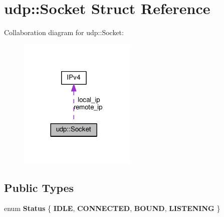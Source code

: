 \hypertarget{structudp_1_1Socket}{}\section{udp\+:\+:Socket Struct Reference}
\label{structudp_1_1Socket}


Collaboration diagram for udp\+:\+:Socket\+:\nopagebreak
\begin{figure}[H]
\begin{center}
\leavevmode
\includegraphics[width=158pt]{structudp_1_1Socket__coll__graph}
\end{center}
\end{figure}
\subsection*{Public Types}
\begin{DoxyCompactItemize}
\item 
enum {\bfseries Status} \{ {\bfseries I\+D\+LE}, 
{\bfseries C\+O\+N\+N\+E\+C\+T\+ED}, 
{\bfseries B\+O\+U\+ND}, 
{\bfseries L\+I\+S\+T\+E\+N\+I\+NG}
 \}\hypertarget{structudp_1_1Socket_a210a8bbcc2ed79b2afdb2c36604bf6fc}{}\label{structudp_1_1Socket_a210a8bbcc2ed79b2afdb2c36604bf6fc}

\end{DoxyCompactItemize}

